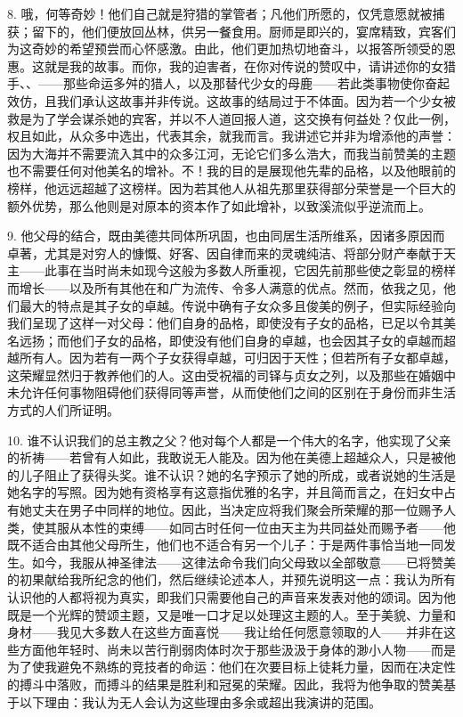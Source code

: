 8. 哦，何等奇妙！他们自己就是狩猎的掌管者；凡他们所愿的，仅凭意愿就被捕获；留下的，他们便放回丛林，供另一餐食用。厨师是即兴的，宴席精致，宾客们为这奇妙的希望预尝而心怀感激。由此，他们更加热切地奋斗，以报答所领受的恩惠。这就是我的故事。而你，我的迫害者，在你对传说的赞叹中，请讲述你的女猎手、、——那些命运多舛的猎人，以及那替代少女的母鹿——若此类事物使你奋起效仿，且我们承认这故事并非传说。这故事的结局过于不体面。因为若一个少女被救是为了学会谋杀她的宾客，并以不人道回报人道，这交换有何益处？仅此一例，权且如此，从众多中选出，代表其余，就我而言。我讲述它并非为增添他的声誉：因为大海并不需要流入其中的众多江河，无论它们多么浩大，而我当前赞美的主题也不需要任何对他美名的增补。不！我的目的是展现他先辈的品格，以及他眼前的榜样，他远远超越了这榜样。因为若其他人从祖先那里获得部分荣誉是一个巨大的额外优势，那么他则是对原本的资本作了如此增补，以致溪流似乎逆流而上。\par

9. 他父母的结合，既由美德共同体所巩固，也由同居生活所维系，因诸多原因而卓著，尤其是对穷人的慷慨、好客、因自律而来的灵魂纯洁、将部分财产奉献于天主——此事在当时尚未如现今这般为多数人所重视，它因先前那些使之彰显的榜样而增长——以及所有其他在和广为流传、令多人满意的优点。然而，依我之见，他们最大的特点是其子女的卓越。传说中确有子女众多且俊美的例子，但实际经验向我们呈现了这样一对父母：他们自身的品格，即使没有子女的品格，已足以令其美名远扬；而他们子女的品格，即使没有他们自身的卓越，也会因其子女的卓越而超越所有人。因为若有一两个子女获得卓越，可归因于天性；但若所有子女都卓越，这荣耀显然归于教养他们的人。这由受祝福的司铎与贞女之列，以及那些在婚姻中未允许任何事物阻碍他们获得同等声誉，从而使他们之间的区别在于身份而非生活方式的人们所证明。\par

10. 谁不认识我们的总主教之父？他对每个人都是一个伟大的名字，他实现了父亲的祈祷——若曾有人如此，我敢说无人能及。因为他在美德上超越众人，只是被他的儿子阻止了获得头奖。谁不认识？她的名字预示了她的所成，或者说她的生活是她名字的写照。因为她有资格享有这意指优雅的名字，并且简而言之，在妇女中占有她丈夫在男子中同样的地位。因此，当决定应将我们聚会所荣耀的那一位赐予人类，使其服从本性的束缚——如同古时任何一位由天主为共同益处而赐予者——他既不适合由其他父母所生，他们也不适合有另一个儿子：于是两件事恰当地一同发生。如今，我服从神圣律法——这律法命令我们向父母致以全部敬意——已将赞美的初果献给我所纪念的他们，然后继续论述本人，并预先说明这一点：我认为所有认识他的人都将视为真实，即我们只需要他自己的声音来发表对他的颂词。因为他既是一个光辉的赞颂主题，又是唯一口才足以处理这主题的人。至于美貌、力量和身材——我见大多数人在这些方面喜悦——我让给任何愿意领取的人——并非在这些方面他年轻时、尚未以苦行削弱肉体时次于那些汲汲于身体的渺小人物——而是为了使我避免不熟练的竞技者的命运：他们在次要目标上徒耗力量，因而在决定性的搏斗中落败，而搏斗的结果是胜利和冠冕的荣耀。因此，我将为他争取的赞美基于以下理由：我认为无人会认为这些理由多余或超出我演讲的范围。\par

